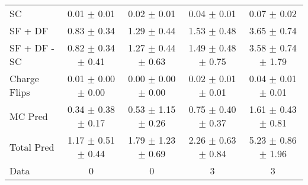 \begin{tabular}{l|cccc}
                                 SC &  0.01 $\pm$  0.01 &  0.02 $\pm$  0.01 &  0.04 $\pm$  0.01 &  0.07 $\pm$  0.02 \\
                            SF + DF &  0.83 $\pm$  0.34 &  1.29 $\pm$  0.44 &  1.53 $\pm$  0.48 &  3.65 $\pm$  0.74 \\
\hline
                       SF + DF - SC &  0.82 $\pm$  0.34 $\pm$  0.41 &  1.27 $\pm$  0.44 $\pm$  0.63 &  1.49 $\pm$  0.48 $\pm$  0.75 &  3.58 $\pm$  0.74 $\pm$  1.79 \\
\hline\hline
                       Charge Flips &  0.01 $\pm$  0.00 $\pm$  0.00 &  0.00 $\pm$  0.00 $\pm$  0.00 &  0.02 $\pm$  0.01 $\pm$  0.01 &  0.04 $\pm$  0.01 $\pm$  0.01 \\
\hline
                            MC Pred &  0.34 $\pm$  0.38 $\pm$  0.17 &  0.53 $\pm$  1.15 $\pm$  0.26 &  0.75 $\pm$  0.40 $\pm$  0.37 &  1.61 $\pm$  0.43 $\pm$  0.81 \\
\hline
                         Total Pred &  1.17 $\pm$  0.51 $\pm$  0.44 &  1.79 $\pm$  1.23 $\pm$  0.69 &  2.26 $\pm$  0.63 $\pm$  0.84 &  5.23 $\pm$  0.86 $\pm$  1.96 \\
\hline\hline
                               Data &     0 &     0 &     3 &     3 \\
\hline\hline
\end{tabular}

